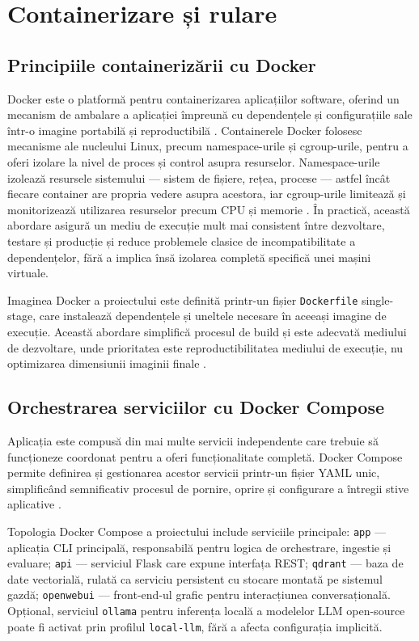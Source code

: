 \documentclass[12pt, a4paper, oneside, romanian]{teza-upb}
\begin{document}
\section{Containerizare și rulare}

\subsection{Principiile containerizării cu Docker}

Docker este o platformă pentru containerizarea aplicațiilor software, 
oferind un mecanism de ambalare a aplicației împreună cu dependențele 
și configurațiile sale într-o imagine portabilă și reproductibilă 
\cite{docker_doc}. Containerele Docker folosesc mecanisme ale nucleului Linux, precum namespace-urile și cgroup-urile, pentru a oferi izolare la nivel de proces și control asupra resurselor. Namespace-urile izolează resursele sistemului — sistem de fișiere, rețea, procese — astfel încât fiecare container are propria 
vedere asupra acestora, iar cgroup-urile limitează și monitorizează utilizarea 
resurselor precum CPU și memorie \cite{docker_doc}. În practică, această abordare asigură un mediu de execuție mult mai consistent între dezvoltare, testare și producție și reduce problemele clasice de incompatibilitate a dependențelor, fără a implica însă izolarea completă specifică unei mașini virtuale.

Imaginea Docker a proiectului este definită printr-un fișier 
\texttt{Dockerfile} single-stage, care instalează dependențele și 
uneltele necesare în aceeași imagine de execuție. Această abordare 
simplifică procesul de build și este adecvată mediului de dezvoltare, 
unde prioritatea este reproductibilitatea mediului de execuție, nu 
optimizarea dimensiunii imaginii finale \cite{docker_doc}.

\subsection{Orchestrarea serviciilor cu Docker Compose}

Aplicația este compusă din mai multe servicii independente care trebuie să funcționeze coordonat pentru a oferi funcționalitate completă. Docker Compose permite definirea și gestionarea acestor servicii printr-un fișier YAML unic, simplificând semnificativ procesul de pornire, oprire și configurare a întregii stive aplicative \cite{docker_compose_doc}.

Topologia Docker Compose a proiectului include serviciile principale: \texttt{app} — aplicația CLI principală, responsabilă pentru logica de orchestrare, ingestie și evaluare; \texttt{api} — serviciul Flask care expune interfața REST; \texttt{qdrant} — baza de date vectorială, rulată ca serviciu persistent cu stocare montată pe sistemul gazdă; \texttt{openwebui} — front-end-ul grafic pentru interacțiunea conversațională. Opțional, serviciul \texttt{ollama} pentru inferența locală a modelelor LLM open-source poate fi activat prin profilul \texttt{local-llm}, fără a afecta configurația implicită.
\end{document}
